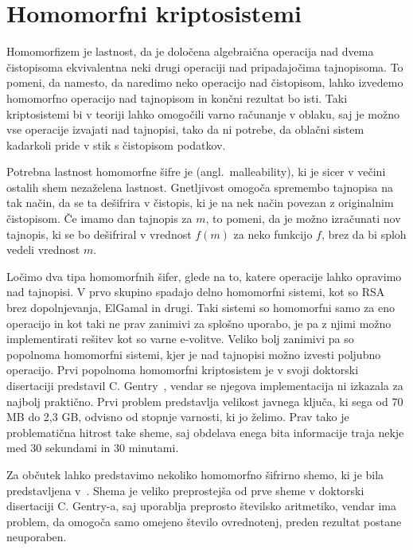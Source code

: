 \documentclass[12pt,a4paper,openany,tikz]{book}
\theoremstyle{plain}
\theoremstyle{definition}
\begin{document}
\section{Homomorfni kriptosistemi}
\label{sec:Homomorfni kriptosistemi}

Homomorfizem je lastnost, da je določena algebraična operacija nad dvema čistopisoma ekvivalentna neki drugi operaciji nad pripadajočima tajnopisoma. To pomeni, da namesto, da naredimo neko operacijo nad čistopisom, lahko izvedemo homomorfno operacijo nad tajnopisom in končni rezultat bo isti. Taki kriptosistemi bi v teoriji lahko omogočili varno računanje v oblaku, saj je možno vse operacije izvajati nad tajnopisi, tako da ni potrebe, da oblačni sistem kadarkoli pride v stik s čistopisom podatkov.

Potrebna lastnost homomorfne šifre je  (angl.\ malleability), ki je sicer v večini ostalih shem nezaželena lastnost. Gnetljivost omogoča spremembo tajnopisa na tak način, da se ta dešifrira v čistopis, ki je na nek način povezan z originalnim čistopisom. Če imamo dan tajnopis za $m$, to pomeni, da je možno izračunati nov tajnopis, ki se bo dešifriral v vrednost $f(m)$ za neko funkcijo $f$, brez da bi sploh vedeli vrednost $m$.

Ločimo dva tipa homomorfnih šifer, glede na to, katere operacije lahko opravimo nad tajnopisi. V prvo skupino spadajo delno homomorfni sistemi, kot so RSA brez dopolnjevanja, ElGamal in drugi. Taki sistemi so homomorfni samo za eno operacijo in kot taki ne prav zanimivi za splošno uporabo, je pa z njimi možno implementirati rešitev kot so varne e-volitve. Veliko bolj zanimivi pa so popolnoma homomorfni sistemi, kjer je nad tajnopisi možno izvesti poljubno operacijo. Prvi popolnoma homomorfni kriptosistem je v svoji doktorski disertaciji predstavil C. Gentry~\cite{gentry2009fully}, vendar se njegova implementacija ni izkazala za najbolj praktično. Prvi problem predstavlja velikost javnega ključa, ki sega od 70 MB do 2,3 GB, odvisno od stopnje varnosti, ki jo želimo. Prav tako je problematična hitrost take sheme, saj obdelava enega bita informacije traja nekje med 30 sekundami in 30 minutami.

Za občutek lahko predstavimo nekoliko homomorfno šifrirno shemo, ki je bila predstavljena v~\cite{gentry2010computing}. Shema je veliko preprostejša od prve sheme v doktorski disertaciji C. Gentry-a, saj uporablja preprosto številsko aritmetiko, vendar ima problem, da omogoča samo omejeno število ovrednotenj, preden rezultat postane neuporaben.
\end{document}

